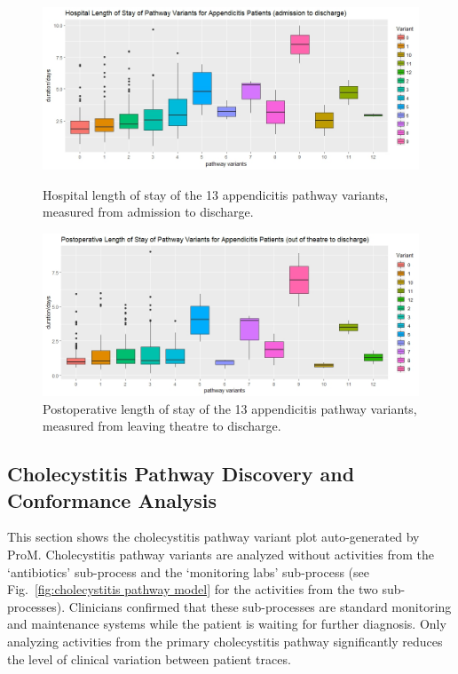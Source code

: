 \begin{figure}[t]
\centering
\includegraphics[width=\textwidth]{images/hospital_length_of_stay_appendicitis_210518.jpeg}
\caption{Hospital length of stay of the 13 appendicitis pathway variants, measured from admission to discharge.}
\label{fig:hospital length of stay appendicitis}
\includegraphics[width=\textwidth]{images/postoperative_length_of_stay_appendicitis.jpeg}
\caption{Postoperative length of stay of the 13 appendicitis pathway variants, measured from leaving theatre to discharge.}
\label{fig:post op length of stay appendicitis}
\end{figure}

\subsection{Cholecystitis Pathway Discovery and Conformance Analysis}
\label{Sec:CholecystitisDiscoveryConformance}
This section shows the cholecystitis pathway variant plot auto-generated by ProM. Cholecystitis pathway variants are analyzed without activities from the `antibiotics' sub-process and the `monitoring labs' sub-process (see Fig.~\ref{fig:cholecystitis pathway model} for the activities from the two sub-processes). Clinicians confirmed that these sub-processes are standard monitoring and maintenance systems while the patient is waiting for further diagnosis. Only analyzing activities from the primary cholecystitis pathway significantly reduces the level of clinical variation between patient traces.

